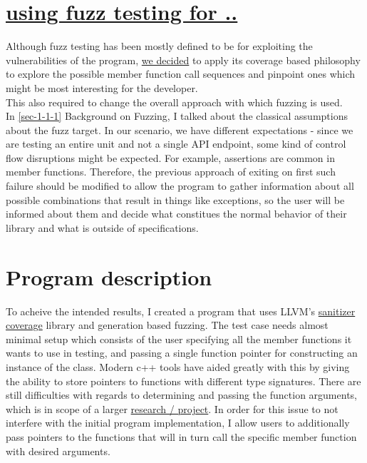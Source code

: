 \documentclass{elteikthesis}[2018/06/06]
\begin{document}
\section{\underline{using fuzz testing for ..}}
\label{sec-1-2}
Although fuzz testing has been mostly defined to be for exploiting the vulnerabilities of the program, \uline{we decided} to apply its coverage based philosophy to explore the possible member function call sequences and pinpoint ones which might be most interesting for the developer. \\
This also required to change the overall approach with which fuzzing is used. \\

In \ref{sec-1-1-1} Background on Fuzzing, I talked about the classical assumptions about the fuzz target. In our scenario, we have different expectations - since we are testing an entire unit and not a single API endpoint, some kind of control flow disruptions might be expected. For example, assertions are common in member functions. Therefore, the previous approach of exiting on first such failure should be modified to allow the program to gather information about all possible combinations that result in things like exceptions, so the user will be informed about them and decide what constitues the normal behavior of their library and what is outside of specifications. \\

\section{Program description}
\label{sec-1-3}
To acheive the intended results, I created a program that uses LLVM's \uline{sanitizer coverage} library and generation based fuzzing. The test case needs almost minimal setup which consists of the user specifying all the member functions it wants to use in testing, and passing a single function pointer for constructing an instance of the class. Modern c++ tools have aided greatly with this by giving the ability to store pointers to functions with different type signatures. There are still difficulties with regards to determining and passing the function arguments, which is in scope of a larger \uline{research / project}. In order for this issue to not interfere with the initial program implementation, I allow users to additionally pass pointers to the functions that will in turn call the specific member function with desired arguments. \\
\end{document}
